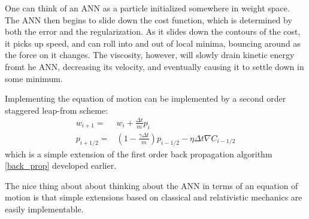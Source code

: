 \documentclass[prl,amsmath,amssymb,floatfix,superscriptaddress,notitlepage,twocolumn]{revtex4}
\newcommand{\ee}[1]{\begin{align} #1 \end{align}} 						%
\begin{document}
One can think of an ANN as a particle initialized somewhere in weight space. The ANN then begins to slide down the cost function, which is determined by both the error and the regularization. As it slides down the contours of the cost, it picks up speed, and can roll into and out of local minima, bouncing around as the force on it changes. The viscosity, however, will slowly drain kinetic energy fromt he ANN, decreasing its velocity, and eventually causing it to settle down in some minimum. 

Implementing the equation of motion can be implemented by a second order staggered leap-from scheme:
\ee{
w_{i+1}=&w_i+\frac{\Delta t}{m}p_i\\
p_{i+1/2}=&(1-\frac{\gamma\Delta t}{m})p_{i-1/2}-\eta\Delta t \nabla C_{i-1/2}
}
which is a simple extension of the first order back propagation algorithm \ref{back_prop} developed earlier. 

The nice thing about about thinking about the ANN in terms of an equation of motion is that simple extensions based on classical and relativistic mechanics are easily implementable. 
\end{document}
